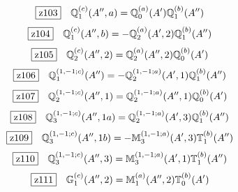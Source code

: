 \documentclass[fleqn,10pt,landscape]{jsarticle}
\begin{document}
\begin{dmath*}
\hspace*{3mm}\fbox{z103}\quad \mathbb{Q}_{1}^{(c)}(A^{\prime\prime},a)=\mathbb{Q}_{0}^{(a)}(A^{\prime}) \mathbb{Q}_{1}^{(b)}(A^{\prime\prime})
\end{dmath*}
\begin{dmath*}
\hspace*{3mm}\fbox{z104}\quad \mathbb{Q}_{1}^{(c)}(A^{\prime\prime},b)=- \mathbb{Q}_{2}^{(a)}(A^{\prime},2) \mathbb{Q}_{1}^{(b)}(A^{\prime\prime})
\end{dmath*}
\begin{dmath*}
\hspace*{3mm}\fbox{z105}\quad \mathbb{Q}_{2}^{(c)}(A^{\prime\prime},2)=\mathbb{Q}_{2}^{(a)}(A^{\prime\prime},2) \mathbb{Q}_{0}^{(b)}(A^{\prime})
\end{dmath*}
\begin{dmath*}
\hspace*{3mm}\fbox{z106}\quad \mathbb{Q}_{1}^{(1,-1;c)}(A^{\prime\prime})=- \mathbb{Q}_{2}^{(1,-1;a)}(A^{\prime},1) \mathbb{Q}_{1}^{(b)}(A^{\prime\prime})
\end{dmath*}
\begin{dmath*}
\hspace*{3mm}\fbox{z107}\quad \mathbb{Q}_{2}^{(1,-1;c)}(A^{\prime\prime},1)=\mathbb{Q}_{2}^{(1,-1;a)}(A^{\prime\prime},1) \mathbb{Q}_{0}^{(b)}(A^{\prime})
\end{dmath*}
\begin{dmath*}
\hspace*{3mm}\fbox{z108}\quad \mathbb{Q}_{3}^{(1,-1;c)}(A^{\prime\prime},1a)=\mathbb{Q}_{2}^{(1,-1;a)}(A^{\prime},3) \mathbb{Q}_{1}^{(b)}(A^{\prime\prime})
\end{dmath*}
\begin{dmath*}
\hspace*{3mm}\fbox{z109}\quad \mathbb{Q}_{3}^{(1,-1;c)}(A^{\prime\prime},1b)=- \mathbb{M}_{3}^{(1,-1;a)}(A^{\prime},3) \mathbb{T}_{1}^{(b)}(A^{\prime\prime})
\end{dmath*}
\begin{dmath*}
\hspace*{3mm}\fbox{z110}\quad \mathbb{Q}_{3}^{(1,-1;c)}(A^{\prime\prime},3)=\mathbb{M}_{3}^{(1,-1;a)}(A^{\prime},1) \mathbb{T}_{1}^{(b)}(A^{\prime\prime})
\end{dmath*}
\begin{dmath*}
\hspace*{3mm}\fbox{z111}\quad \mathbb{G}_{1}^{(c)}(A^{\prime\prime},2)=\mathbb{M}_{1}^{(a)}(A^{\prime\prime},2) \mathbb{T}_{0}^{(b)}(A^{\prime})
\end{dmath*}
\end{document}
